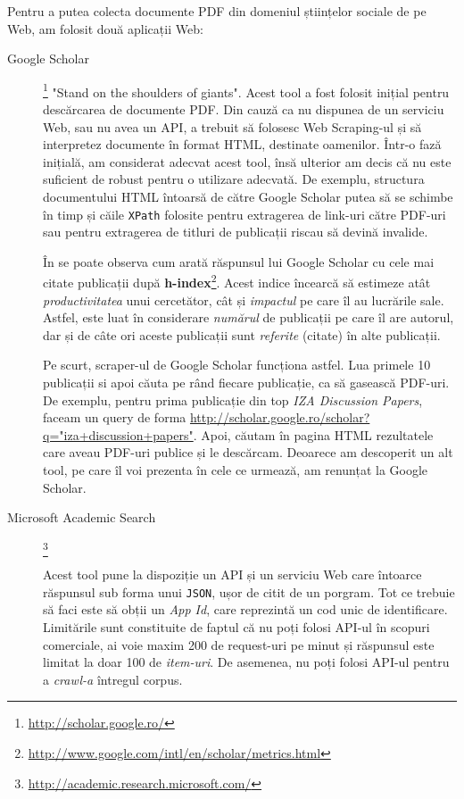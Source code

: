 Pentru a putea colecta documente PDF din domeniul științelor sociale de pe Web, am folosit două aplicații Web:
\begin{description}
\item[Google Scholar]\footnote{\url{http://scholar.google.ro/}} "Stand on the shoulders of giants". Acest tool a fost folosit inițial pentru descărcarea de documente PDF. Din cauză ca nu dispunea de un serviciu Web, sau nu avea un API, a trebuit să folosesc Web Scraping-ul și să interpretez documente în format HTML, destinate oamenilor. Într-o fază inițială, am considerat adecvat acest tool, însă ulterior am decis că nu este suficient de robust pentru o utilizare adecvată. De exemplu, structura documentului HTML întoarsă de către Google Scholar putea să se schimbe în timp și căile \texttt{XPath} folosite pentru extragerea de link-uri către PDF-uri sau pentru extragerea de titluri de publicații riscau să devină invalide.


În  se poate observa cum arată răspunsul lui Google Scholar cu cele mai citate publicații după \textbf{h-index}\footnote{\url{http://www.google.com/intl/en/scholar/metrics.html}}. Acest indice încearcă să estimeze atât \textit{productivitatea} unui cercetător, cât și \textit{impactul} pe care îl au lucrările sale. Astfel, este luat în considerare \textit{numărul} de publicații pe care îl are autorul, dar și de câte ori aceste publicații sunt \textit{referite} (citate) în alte publicații.


Pe scurt, scraper-ul de Google Scholar funcționa astfel. Lua primele 10 publicații si apoi căuta pe rând fiecare publicație, ca să gasească PDF-uri. De exemplu, pentru prima publicație din top \textit{IZA Discussion Papers}, faceam un query de forma \url{http://scholar.google.ro/scholar?q="iza+discussion+papers"}. Apoi, căutam în pagina HTML rezultatele care aveau PDF-uri publice și le descărcam. Deoarece am descoperit un alt tool, pe care îl voi prezenta în cele ce urmează, am renunțat la Google Scholar.


\item [Microsoft Academic Search]\footnote{\url{http://academic.research.microsoft.com/}}

Acest tool pune la dispoziție un API și un serviciu Web care întoarce răspunsul sub forma unui \texttt{JSON}, ușor de citit de un porgram. Tot ce trebuie să faci este să obții un \textit{App Id}, care reprezintă un cod unic de identificare. Limitările sunt constituite de faptul că nu poți folosi API-ul în scopuri comerciale, ai voie maxim 200 de request-uri pe minut și răspunsul este limitat la doar 100 de \textit{item-uri}. De asemenea, nu poți folosi API-ul pentru a \textit{crawl-a} întregul corpus.



\end{description}
